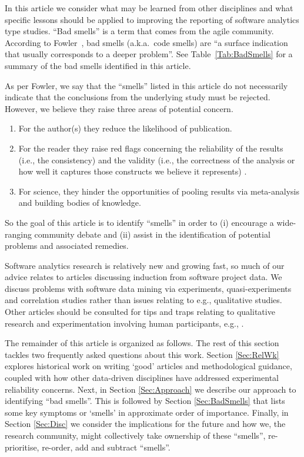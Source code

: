 \documentclass[10pt]{elsarticle}
\newcommand{\RED}{\color{black}}
\newcommand{\BLACK}{\color{black}}
\begin{document}
In this article we consider what may be learned from other disciplines and what specific lessons should be applied to improving the reporting of software analytics type studies.  ``Bad smells'' is a term that comes from the agile community. According to Fowler~\cite{beck1999bad}, bad smells (a.k.a.\ code smells) are ``a surface indication that usually corresponds to a deeper problem''.  See Table~\ref{Tab:BadSmells} for a summary of the bad smells identified in this article.

As per Fowler, we say that the ``smells''  listed in this article do not necessarily indicate that the conclusions from the underlying study must be rejected.  However, we believe they raise three areas of potential concern.
\begin{enumerate}
    \item For the author(s) they reduce the likelihood of publication.
    \item For the reader they raise red flags concerning the reliability of the results \RED (i.e., the consistency) and the validity (i.e., the correctness of the analysis or how well it captures those constructs we believe it represents) \BLACK.
    \item For science, they hinder the opportunities of pooling results via meta-analysis and building bodies of knowledge. 
\end{enumerate}
So the goal of this article is to identify ``smells'' in order to (i) encourage a wide-ranging community debate and (ii) assist in the identification of potential problems and associated remedies.  

Software analytics research is relatively new and growing fast, so much of our advice relates to articles discussing induction from software project data. We discuss problems with software data mining via experiments, quasi-experiments and correlation studies \cite{Shad02} rather than issues relating to e.g., qualitative studies.  Other articles should be consulted for tips and traps relating to qualitative research and experimentation involving human participants, e.g., \cite{stol2016grounded,cruzes2011research,ko2015practical,petersen2015guidelines}.

The remainder of this article is organized as follows. The rest of this section tackles two frequently asked questions about this work. Section \ref{Sec:RelWk} explores historical work on writing `good' articles and methodological guidance, coupled with how other data-driven disciplines have addressed experimental reliability concerns.  Next, in Section \ref{Sec:Approach} we describe our approach to identifying ``bad smells''.  This is followed by Section \ref{Sec:BadSmells} that lists some key symptoms or `smells' in approximate order of importance.  Finally, in Section \ref{Sec:Disc} we consider the implications for the future and how we, the research community, might collectively take ownership of these ``smells'', re-prioritise, re-order, add and subtract ``smells''.
\end{document}
